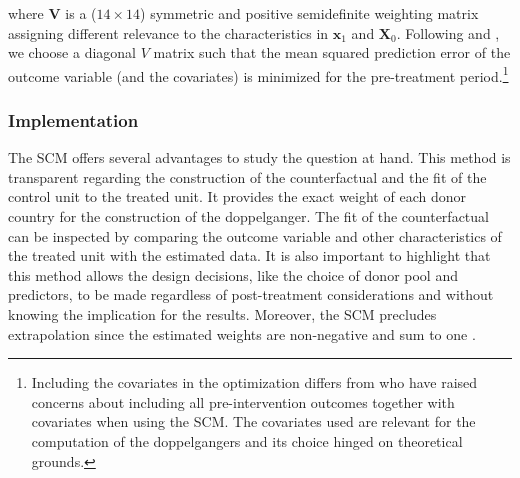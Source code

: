 \documentclass[12pt]{article}
\renewcommand{\vec}[1]{\mathbf{#1}}
\begin{document}
where $\vec{V}$ is a ($14 \times 14$) symmetric and positive semidefinite weighting matrix assigning different relevance to the characteristics in $\vec{x}_1$ and $\vec{X}_0$. Following \cite{Abadie2003} and \cite{Abadie2010}, we choose a diagonal $V$ matrix such that the mean squared prediction error of the outcome variable (and the covariates) is minimized for the pre-treatment period.\footnote{Including the covariates in the optimization differs from \cite{Kaul2018} who have raised concerns about including all pre-intervention outcomes together with covariates when using the SCM. The covariates used are relevant for the computation of the doppelgangers and its choice hinged on theoretical grounds.}



\subsubsection{Implementation \label{SS_Implementation}}

The SCM offers several advantages to study the question at hand. This method is transparent regarding the construction of the counterfactual and the fit of the control unit to the treated unit. It provides the exact weight of each donor country for the construction of the doppelganger. The fit of the counterfactual can be inspected by comparing the outcome variable and other characteristics of the treated unit with the estimated data. It is also important to highlight that this method allows the design decisions, like the choice of donor pool and predictors, to be made regardless of post-treatment considerations and without knowing the implication for the results. Moreover, the SCM precludes extrapolation since the estimated weights are non-negative and sum to one \citep{King2006}.
\end{document}
